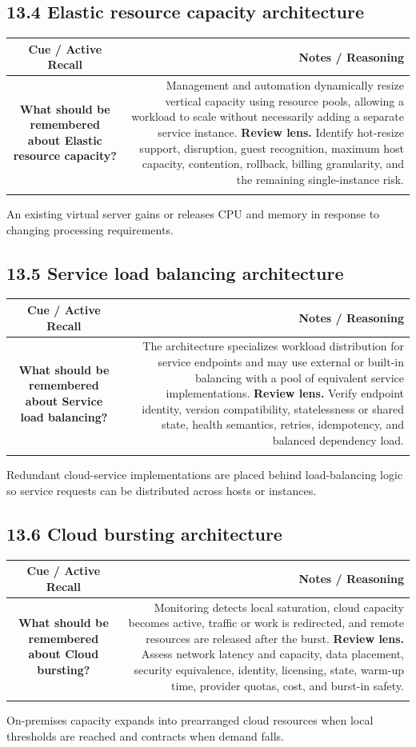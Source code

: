 \documentclass[11pt]{article}
\newcommand{\CornellHeader}{\rowcolor{Navy}\color{white}\bfseries Cue / Active Recall & \color{white}\bfseries Notes / Reasoning \\\endhead}
\newcommand{\CornellRow}[2]{\cellcolor{CueGray}\textbf{#1} & #2 \\\addlinespace[3pt]}
\begin{document}
\subsection{13.4 Elastic resource capacity architecture}
\begin{longtable}{@{}C N@{}}
\CornellHeader
\CornellRow{What should be remembered about Elastic resource capacity?}{Management and automation dynamically resize vertical capacity using resource pools, allowing a workload to scale without necessarily adding a separate service instance. \textbf{Review lens.} Identify hot-resize support, disruption, guest recognition, maximum host capacity, contention, rollback, billing granularity, and the remaining single-instance risk.}
\end{longtable}
\begin{sectionsummarybox}
An existing virtual server gains or releases CPU and memory in response to changing processing requirements.
\end{sectionsummarybox}
\subsection{13.5 Service load balancing architecture}
\begin{longtable}{@{}C N@{}}
\CornellHeader
\CornellRow{What should be remembered about Service load balancing?}{The architecture specializes workload distribution for service endpoints and may use external or built-in balancing with a pool of equivalent service implementations. \textbf{Review lens.} Verify endpoint identity, version compatibility, statelessness or shared state, health semantics, retries, idempotency, and balanced dependency load.}
\end{longtable}
\begin{sectionsummarybox}
Redundant cloud-service implementations are placed behind load-balancing logic so service requests can be distributed across hosts or instances.
\end{sectionsummarybox}
\subsection{13.6 Cloud bursting architecture}
\begin{longtable}{@{}C N@{}}
\CornellHeader
\CornellRow{What should be remembered about Cloud bursting?}{Monitoring detects local saturation, cloud capacity becomes active, traffic or work is redirected, and remote resources are released after the burst. \textbf{Review lens.} Assess network latency and capacity, data placement, security equivalence, identity, licensing, state, warm-up time, provider quotas, cost, and burst-in safety.}
\end{longtable}
\begin{sectionsummarybox}
On-premises capacity expands into prearranged cloud resources when local thresholds are reached and contracts when demand falls.
\end{sectionsummarybox}
\end{document}
